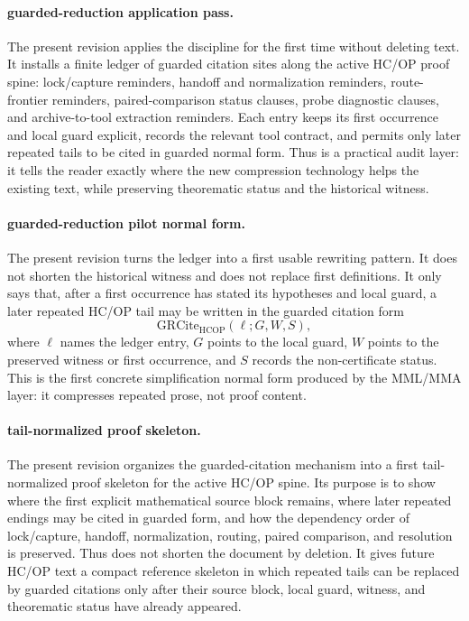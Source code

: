 \paragraph{guarded-reduction application pass.}
The present revision applies the discipline for the first time without deleting text. It installs a finite ledger of guarded citation sites along the active HC/OP proof spine: lock/capture reminders, handoff and normalization reminders, route-frontier reminders, paired-comparison status clauses, probe diagnostic clauses, and archive-to-tool extraction reminders. Each entry keeps its first occurrence and local guard explicit, records the relevant tool contract, and permits only later repeated tails to be cited in guarded normal form. Thus is a practical audit layer: it tells the reader exactly where the new compression technology helps the existing text, while preserving theorematic status and the historical witness.


\paragraph{guarded-reduction pilot normal form.}
The present revision turns the ledger into a first usable rewriting pattern. It does not shorten the historical witness and does not replace first definitions. It only says that, after a first occurrence has stated its hypotheses and local guard, a later repeated HC/OP tail may be written in the guarded citation form
\[
 \mathrm{GRCite}_{\mathrm{HCOP}}(\ell;G,W,S),
\]
where \(\ell\) names the ledger entry, \(G\) points to the local guard, \(W\) points to the preserved witness or first occurrence, and \(S\) records the non-certificate status. This is the first concrete simplification normal form produced by the MML/MMA layer: it compresses repeated prose, not proof content.

\paragraph{tail-normalized proof skeleton.}
The present revision organizes the guarded-citation mechanism into a first tail-normalized proof skeleton for the active HC/OP spine. Its purpose is to show where the first explicit mathematical source block remains, where later repeated endings may be cited in guarded form, and how the dependency order of lock/capture, handoff, normalization, routing, paired comparison, and resolution is preserved. Thus does not shorten the document by deletion. It gives future HC/OP text a compact reference skeleton in which repeated tails can be replaced by guarded citations only after their source block, local guard, witness, and theorematic status have already appeared.
